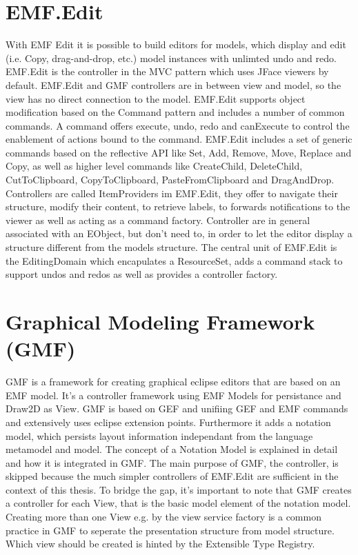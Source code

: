 \section{EMF.Edit}
With EMF Edit it is possible to build editors for models, which display and edit (i.e. Copy, drag-and-drop, etc.) model instances with unlimted undo and redo. EMF.Edit is the controller in the MVC pattern which uses JFace viewers by default. EMF.Edit and GMF controllers are in between view and model, so the view has no direct connection to the model. EMF.Edit supports object modification based on the Command pattern and includes a number of common commands. A command  offers execute, undo, redo and canExecute to control the enablement of actions bound to the command.  EMF.Edit includes a set of generic commands based on the reflective API like Set, Add, Remove, Move, Replace and Copy, as well as  higher level commands like CreateChild, DeleteChild, CutToClipboard, CopyToClipboard, PasteFromClipboard and DragAndDrop. Controllers are called ItemProviders im EMF.Edit, they offer to navigate their structure, modify their content, to retrieve labels, to forwards notifications to the viewer as well as acting as a command factory. Controller are in general associated with an EObject, but don't need to, in order to let the editor display a structure different from the models structure. The central unit of EMF.Edit is the EditingDomain which encapulates a ResourceSet, adds a command stack to support undos and redos as well as provides a controller factory. \cite{EMF2nd} 


\section {Graphical Modeling Framework (GMF)}
GMF is a framework for creating graphical eclipse editors that are based on an EMF model. It's a controller framework using EMF Models for persistance and Draw2D as View. GMF is based on GEF and unifiing GEF and EMF commands and extensively uses eclipse extension points. Furthermore it adds a notation model, which persists layout information independant from the language metamodel and model. The concept of a Notation Model is explained in detail and how it is integrated in GMF. The main purpose of GMF, the controller, is skipped because the much simpler controllers of EMF.Edit are sufficient in the context of this thesis. To bridge the gap, it's important to note that GMF creates a controller for each View, that is the basic model element of the notation model. Creating more than one View e.g. by the view service factory is a common practice in GMF to seperate the presentation structure from model structure. Which view should be created is hinted by the Extensible Type Registry.

